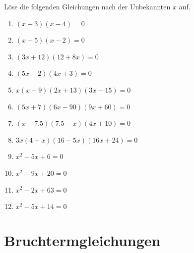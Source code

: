 \documentclass[11pt,oneside]{article}
\begin{document}
	\begin{aufgabe}
		Löse die folgenden Gleichungen nach der Unbekannten $x$ auf.\vspace*{5pt}\newline
		\begin{minipage}{0.3\linewidth}
			\begin{enumerate}[label=\alph*)]
				\item $(x-3)(x-4)=0$
				\item $(x+5)(x-2)=0$
				\item $(3x+12)(12+8x)=0$
				\item $(5x-2)(4x+3)=0$
			\end{enumerate}
		\end{minipage}
		\hfill
		\begin{minipage}{0.4\linewidth}
			\begin{enumerate}[label=\alph*)]
				\setcounter{enumi}{4}
				\item $x(x-9)(2x+13)(3x-15)=0$
				\item $(5x+7)(6x-90)(9x+60)=0$
				\item $(x-7.5)(7.5-x)(4x+10)=0$
				\item $3x(4+x)(16-5x)(16x+24)=0$
			\end{enumerate}
		\end{minipage}
		\hfill
		\begin{minipage}{0.25\linewidth}
			\begin{enumerate}[label=\alph*)]
				\setcounter{enumi}{8}
				\item $x^2-5x+6=0$
				\item $x^2-9x+20=0$
				\item $x^2-2x+63=0$
				\item $x^2-5x+14=0$
			\end{enumerate}
		\end{minipage}
	\end{aufgabe}


\newpage
\section{Bruchtermgleichungen}
\end{document}
